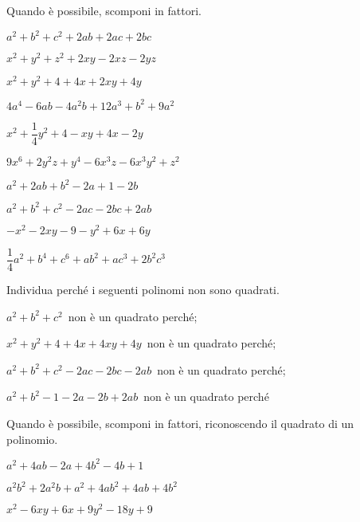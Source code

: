 \begin{esercizio}
\label{ese:16.13}
Quando è possibile, scomponi in fattori.

\vspace{-.5em}
\begin{htmulticols}{2}
\begin{enumeratea}
\item \(a^{2}+b^{2}+c^{2}+2ab+2ac+2bc\)
\item \(x^{2}+y^{2}+z^{2}+2xy-2xz-2yz\)
\item \(x^{2}+y^{2}+4+4x+2xy+4y\)
\item \(4a^{4}-6{ab}-4a^{2}b+12a^{3}+b^{2}+9a^{2}\)
\item \(x^{2}+\dfrac{1}{4}y^{2}+4-xy+4x-2y\)
\item \(9x^{6}+2y^{2}z+y^{4}-6x^{3}z-6x^{3}y^{2}+z^{2}\)
\item \(a^{2}+2ab+b^{2}-2a+1-2b\)
\item \(a^{2}+b^{2}+c^{2}-2ac-2bc+2ab\)
\item \(-x^{2}-2xy-9-y^{2}+6x+6y\)
\item \(\dfrac{1}{4}a^{2}+b^{4}+c^{6}+ab^{2}+{ac}^{3}+2b^{2}c^{3}\)
\end{enumeratea}
\end{htmulticols}
\end{esercizio}

\begin{esercizio}
Individua perché i seguenti polinomi non sono quadrati.
\label{ese:16.16}
\begin{enumeratea}
\item \(a^{2}+b^{2}+c^{2}\)\, non è un quadrato perché\dotfill;
\item \(x^{2}+y^{2}+4+4x+4xy+4y\)\, non è un quadrato perché\dotfill;
\item \(a^{2}+b^{2}+c^{2}-2ac-2bc-2ab\)\, non è un quadrato perché\dotfill;
\item \(a^{2}+b^{2}-1-2a-2b+2ab\)\, non è un quadrato perché\dotfill
\end{enumeratea}
\end{esercizio}

\begin{esercizio}[*]
\label{ese:16.17}
Quando è possibile, scomponi in fattori, riconoscendo il quadrato di un 
polinomio.
\begin{enumeratea}
\item \(a^{2}+4ab-2a+4b^{2}-4b+1\)
\item \(a^{2}b^{2}+2a^{2}b+a^{2}+4ab^{2}+4ab+4b^{2}\)
\item \(x^{2}-6xy+6x+9y^{2}-18y+9\)
\end{enumeratea}
\end{esercizio}

